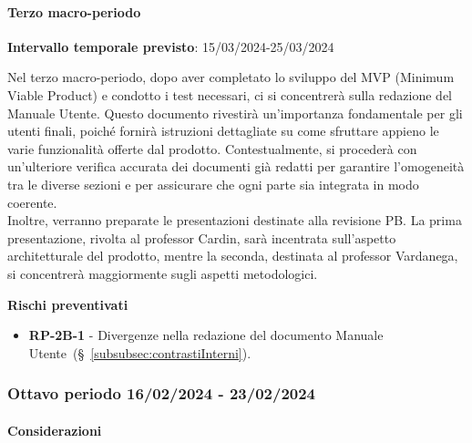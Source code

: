 \paragraph{Terzo macro-periodo}

\textbf{Intervallo temporale previsto}: 15/03/2024-25/03/2024 \\ 

\vspace{0.2cm}

Nel terzo macro-periodo, dopo aver completato lo sviluppo del MVP (Minimum Viable Product) e condotto i test necessari, ci si concentrerà sulla redazione del Manuale Utente. Questo documento rivestirà un'importanza fondamentale per gli utenti finali, poiché fornirà istruzioni dettagliate su come sfruttare appieno le varie funzionalità offerte dal prodotto.
Contestualmente, si procederà con un’ulteriore verifica accurata dei documenti già redatti per garantire l’omogeneità tra le diverse sezioni e per assicurare che ogni parte sia integrata in modo coerente. \\
Inoltre, verranno preparate le presentazioni destinate alla revisione PB. La prima presentazione, rivolta al professor Cardin, sarà incentrata sull'aspetto architetturale del prodotto, mentre la seconda, destinata al professor Vardanega, si concentrerà maggiormente sugli aspetti metodologici.

\vspace{0.4cm}

\textbf{Rischi preventivati}
\begin{itemize}
    \item \textbf{RP-2B-1} - Divergenze nella redazione del documento Manuale Utente~(\S~\ref{subsubsec:contrastiInterni}).
\end{itemize}


\subsubsection{Ottavo periodo  16/02/2024 - 23/02/2024}
\paragraph{Considerazioni}

